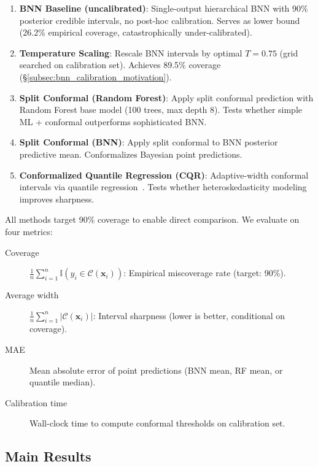 \begin{enumerate}
    \item \textbf{BNN Baseline (uncalibrated)}: Single-output hierarchical BNN with 90\% posterior credible intervals, no post-hoc calibration. Serves as lower bound (26.2\% empirical coverage, catastrophically under-calibrated).

    \item \textbf{Temperature Scaling}: Rescale BNN intervals by optimal $T=0.75$ (grid searched on calibration set). Achieves 89.5\% coverage (\S\ref{subsec:bnn_calibration_motivation}).

    \item \textbf{Split Conformal (Random Forest)}: Apply split conformal prediction with Random Forest base model (100 trees, max depth 8). Tests whether simple ML + conformal outperforms sophisticated BNN.

    \item \textbf{Split Conformal (BNN)}: Apply split conformal to BNN posterior predictive mean. Conformalizes Bayesian point predictions.

    \item \textbf{Conformalized Quantile Regression (CQR)}: Adaptive-width conformal intervals via quantile regression~\citep{romano2019cqr}. Tests whether heteroskedasticity modeling improves sharpness.
\end{enumerate}

All methods target 90\% coverage to enable direct comparison. We evaluate on four metrics:

\begin{description}
    \item[Coverage] $\frac{1}{n}\sum_{i=1}^{n} \mathbb{I}(y_i \in \mathcal{C}(\mathbf{x}_i))$: Empirical miscoverage rate (target: 90\%).
    \item[Average width] $\frac{1}{n}\sum_{i=1}^{n} |\mathcal{C}(\mathbf{x}_i)|$: Interval sharpness (lower is better, conditional on coverage).
    \item[MAE] Mean absolute error of point predictions (BNN mean, RF mean, or quantile median).
    \item[Calibration time] Wall-clock time to compute conformal thresholds on calibration set.
\end{description}

\subsection{Main Results}\label{subsec:conformal-main-results}

